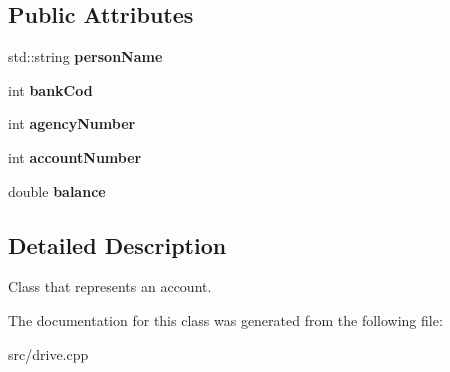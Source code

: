 \subsection*{Public Attributes}
\begin{DoxyCompactItemize}
\item 
std\+::string {\bfseries person\+Name}\hypertarget{classAccount_a64823c3dd079dd41c8d046e5893a39f8}{}\label{classAccount_a64823c3dd079dd41c8d046e5893a39f8}

\item 
int {\bfseries bank\+Cod}\hypertarget{classAccount_a04fc5b32adc4caf24540485d675beab2}{}\label{classAccount_a04fc5b32adc4caf24540485d675beab2}

\item 
int {\bfseries agency\+Number}\hypertarget{classAccount_afa09a0f752eb577b711851b0098b751d}{}\label{classAccount_afa09a0f752eb577b711851b0098b751d}

\item 
int {\bfseries account\+Number}\hypertarget{classAccount_a92e2552bc9214e93070df37a483fcc1a}{}\label{classAccount_a92e2552bc9214e93070df37a483fcc1a}

\item 
double {\bfseries balance}\hypertarget{classAccount_a6e41f403b4813738ba835377f212de33}{}\label{classAccount_a6e41f403b4813738ba835377f212de33}

\end{DoxyCompactItemize}


\subsection{Detailed Description}
Class that represents an account. 

The documentation for this class was generated from the following file\+:\begin{DoxyCompactItemize}
\item 
src/drive.\+cpp\end{DoxyCompactItemize}
